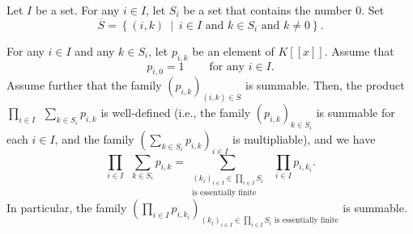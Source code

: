 \begin{proposition}
\label{prop.fps.prodrule-inf-inf}
\leantarget
\leanok
Let $I$ be a set. For any $i\in I$, let
$S_{i}$ be a set that contains the number $0$. Set%
\[
\overline{S}=\left\{  \left(  i,k\right)  \ \mid\ i\in I\text{ and }k\in
S_{i}\text{ and }k\neq0\right\}  .
\]

For any $i\in I$ and any $k\in S_{i}$, let $p_{i,k}$ be an element of
$K\left[  \left[  x\right]  \right]  $. Assume that
\begin{equation}
p_{i,0}=1\ \ \ \ \ \ \ \ \ \ \text{for any }i\in I.
\label{eq.prop.fps.prodrule-inf-inf.pi0=1}%
\end{equation}
Assume further that the family $\left(  p_{i,k}\right)  _{\left(  i,k\right)
\in\overline{S}}$ is summable. Then, the product $\prod_{i\in I}\ \ \sum_{k\in
S_{i}}p_{i,k}$ is well-defined (i.e., the family $\left(  p_{i,k}\right)
_{k\in S_{i}}$ is summable for each $i\in I$, and the family $\left(
\sum_{k\in S_{i}}p_{i,k}\right)  _{i\in I}$ is multipliable), and we have%
\begin{equation}
\prod_{i\in I}\ \ \sum_{k\in S_{i}}p_{i,k}=\sum_{\substack{\left(
k_{i}\right)  _{i\in I}\in\prod_{i\in I}S_{i}\\\text{is essentially finite}%
}}\ \ \prod_{i\in I}p_{i,k_{i}}. \label{eq.prop.fps.prodrule-inf-inf.eq}%
\end{equation}
In particular, the family $\left(  \prod_{i\in I}p_{i,k_{i}}\right)  _{\left(
k_{i}\right)  _{i\in I}\in\prod_{i\in I}S_{i}\text{ is essentially finite}}$
is summable.
\end{proposition}

